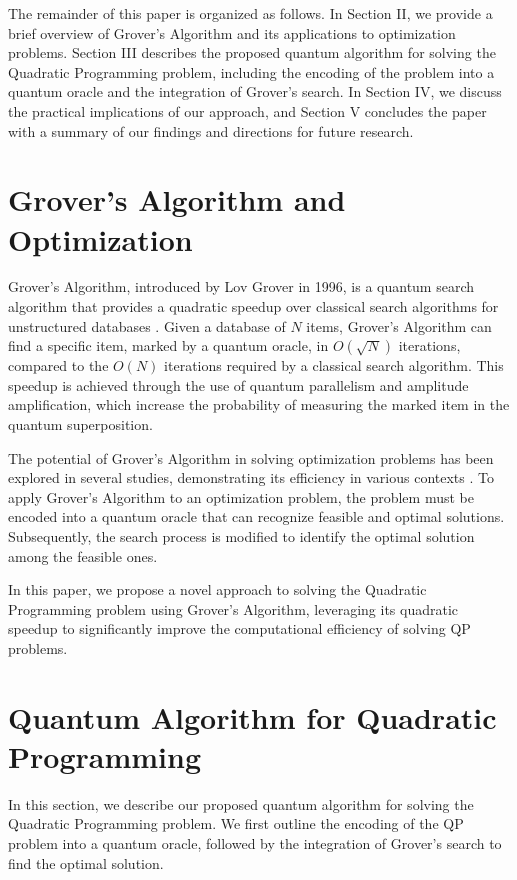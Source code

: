 The remainder of this paper is organized as follows. In Section II, we provide a brief overview of Grover's Algorithm and its applications to optimization problems. Section III describes the proposed quantum algorithm for solving the Quadratic Programming problem, including the encoding of the problem into a quantum oracle and the integration of Grover's search. In Section IV, we discuss the practical implications of our approach, and Section V concludes the paper with a summary of our findings and directions for future research.

\section{Grover's Algorithm and Optimization}

Grover's Algorithm, introduced by Lov Grover in 1996, is a quantum search algorithm that provides a quadratic speedup over classical search algorithms for unstructured databases \cite{grover1996fast}. Given a database of $N$ items, Grover's Algorithm can find a specific item, marked by a quantum oracle, in $O(\sqrt{N})$ iterations, compared to the $O(N)$ iterations required by a classical search algorithm. This speedup is achieved through the use of quantum parallelism and amplitude amplification, which increase the probability of measuring the marked item in the quantum superposition.

The potential of Grover's Algorithm in solving optimization problems has been explored in several studies, demonstrating its efficiency in various contexts \cite{daskin2011quantum}. To apply Grover's Algorithm to an optimization problem, the problem must be encoded into a quantum oracle that can recognize feasible and optimal solutions. Subsequently, the search process is modified to identify the optimal solution among the feasible ones.

In this paper, we propose a novel approach to solving the Quadratic Programming problem using Grover's Algorithm, leveraging its quadratic speedup to significantly improve the computational efficiency of solving QP problems.

\section{Quantum Algorithm for Quadratic Programming}

In this section, we describe our proposed quantum algorithm for solving the Quadratic Programming problem. We first outline the encoding of the QP problem into a quantum oracle, followed by the integration of Grover's search to find the optimal solution.

